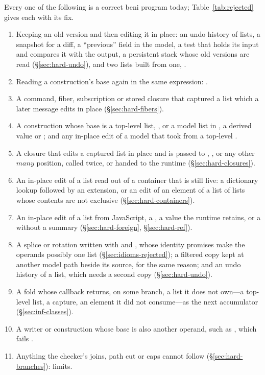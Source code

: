 Every one of the following is a correct beni program today; Table~\ref{tab:rejected} gives each with its
fix.
\begin{enumerate}
\item Keeping an old version and then editing it in place: an undo history of lists, a snapshot for a
diff, a ``previous'' field in the model, a test that holds its input and compares it with the output, a
persistent stack whose old versions are read (\S\ref{sec:hard-undo}), and two lists built from one,
.
\item Reading a construction's base again in the same expression:
.
\item A command, fiber, subscription or stored closure that captured a list which a later message edits
in place (\S\ref{sec:hard-fibers}).
\item A construction whose base is a top-level list, \code{[ x, …defaults ]}, or a model list in
, a derived value or ; and any in-place edit of a model that 
took from a top-level .
\item A closure that edits a captured list in place and is passed to , ,
 or any other $\mathit{many}$ position, called twice, or handed to the runtime
(\S\ref{sec:hard-closures}).
\item An in-place edit of a list read out of a container that is still live: a dictionary lookup
followed by an extension, or an edit of an element of a list of lists whose contents are not exclusive
(\S\ref{sec:hard-containers}).
\item An in-place edit of a list from JavaScript, a , a value the runtime retains, or a
 without a summary (\S\ref{sec:hard-foreign}, \S\ref{sec:hard-ref}).
\item A splice or rotation written with  and , whose identity promises make the
operands possibly one list (\S\ref{sec:idioms-rejected}); a filtered copy kept at another model path
beside its source, for the same reason; and an undo history of a list, which needs a second copy
(\S\ref{sec:hard-undo}).
\item A fold whose callback returns, on some branch, a list it does not own---a top-level list, a capture,
an element it did not consume---as the next accumulator (\S\ref{sec:inf-classes}).
\item A writer or construction whose base is also another operand, such as \code{[ …xs, …xs ]}, which
fails \Disjoint.
\item Anything the checker's joins, path cut or caps cannot follow (\S\ref{sec:hard-branches}): limits.
\end{enumerate}
